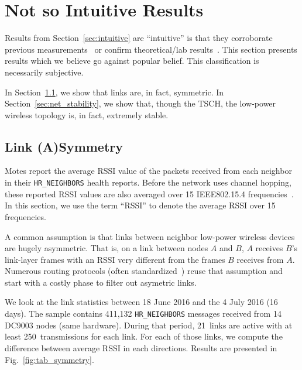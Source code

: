 \documentclass{sig-alternate}
\newcommand{\HRNEIGHBORS}         {{\tt HR\_NEIGHBORS}\xspace}
\begin{document}
\section{Not so Intuitive Results}
\label{sec:notsointuitive}

Results from Section~\ref{sec:intuitive} are ``intuitive'' is that they corroborate previous measurements~\cite{watteyne16peach} or confirm theoretical/lab results~\cite{watteyne10mitigating,watteyne09reliability,watteyne15industrial}.
This section presents results which we believe go against popular belief.
This classification is necessarily subjective.

In Section~\ref{sec:symmetry}, we show that links are, in fact, symmetric.
In Section~\ref{sec:net_stability}, we show that, though the TSCH, the low-power wireless topology is, in fact, extremely stable.

\subsection{Link (A)Symmetry}
\label{sec:symmetry}


Motes report the average RSSI value of the packets received from each neighbor in their \HRNEIGHBORS health reports.
Before the network uses channel hopping, these reported RSSI values are also averaged over 15 IEEE802.15.4 frequencies~\cite{std_ieee802154_2011}.
In this section, we use the term ``RSSI'' to denote the average RSSI over 15 frequencies.


A common assumption is that links between neighbor low-power wireless devices are hugely asymmetric.
That is, on a link between nodes $A$ and $B$, $A$ receives $B$'s link-layer frames with an RSSI very different from the frames $B$ receives from $A$.
Numerous routing protocols (often standardized~\cite{rfc3626}) reuse that assumption and start with a costly phase to filter out asymetric links.


We look at the link statistics between 18 June 2016 and the 4 July 2016 (16 days).
The sample contains 411,132 \HRNEIGHBORS messages received from 14 DC9003 nodes (same hardware).
During that period, 21~links are active with at least 250~transmissions for each link.
For each of those links, we compute the difference between average RSSI in each directions.
Results are presented in Fig.~\ref{fig:tab_symmetry}.
\end{document}
